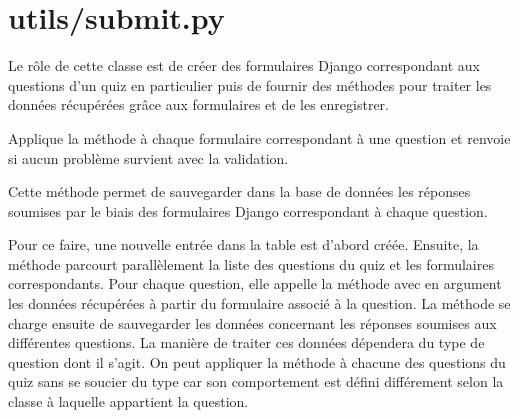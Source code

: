 \documentclass[a4,10pt,french]{sphinxmanual}
\begin{document}
\section{utils/submit.py}
\label{source:utils-submit-py}\label{source:module-quiz.utils.submit}

\begin{fulllineitems}
\label{source:quiz.utils.submit.QuizForms}
Le rôle de cette classe est de créer des formulaires Django correspondant aux
questions d'un quiz en particulier puis de fournir des méthodes pour traiter
les données récupérées grâce aux formulaires et de les enregistrer.

\begin{fulllineitems}
\label{source:quiz.utils.submit.QuizForms.are_valid}
Applique la méthode  à chaque formulaire correspondant à une
question et renvoie  si aucun problème survient avec la validation.

\end{fulllineitems}


\begin{fulllineitems}
\label{source:quiz.utils.submit.QuizForms.save_answers}
Cette méthode permet de sauvegarder dans la base de données les réponses
soumises par le biais des formulaires Django correspondant à chaque question.

Pour ce faire, une nouvelle entrée dans la table  est
d'abord créée. Ensuite, la méthode parcourt parallèlement la liste des questions
du quiz et les formulaires correspondants. Pour chaque question, elle appelle
la méthode  avec en argument les données récupérées à partir
du formulaire associé à la question. La méthode  se charge
ensuite de sauvegarder les données concernant les réponses soumises aux différentes
questions. La manière de traiter ces données dépendera du type de question
dont il s'agit. On peut appliquer la méthode  à chacune
des questions du quiz sans se soucier du type car son comportement est défini
différement selon la classe à laquelle appartient la question.

\end{fulllineitems}


\end{fulllineitems}
\end{document}
